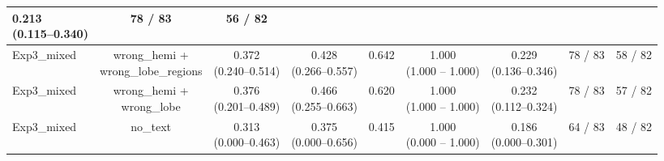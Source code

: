\documentclass[a4paper,12pt]{article}
\begin{document}
\begin{table}[ht]
\begin{tabular}{lcccccccc}
\makecell{0.213 \\ (0.115--0.340)} &
78 / 83 &
\colorbox{orange!20}{56 / 82} \\
\hline
Exp3\_mixed &
\makecell{wrong\_hemi + \\ wrong\_lobe\_regions} &
\makecell{\colorbox{blue!20}{0.372} \\ (0.240--0.514)} &
\makecell{\colorbox{orange!20}{0.428} \\ (0.266--0.557)} &
\colorbox{blue!20}{0.642} &
\makecell{1.000 \\ (1.000 -- 1.000)} &
\makecell{\colorbox{blue!20}{0.229} \\ (0.136--0.346)} &
78 / 83 &
\colorbox{green!20}{58 / 82} \\
\hline
Exp3\_mixed &
\makecell{wrong\_hemi + \\ wrong\_lobe} &
\makecell{\colorbox{green!20}{0.376} \\ (0.201--0.489)} &
\makecell{\colorbox{blue!20}{0.466} \\ (0.255--0.663)} &
0.620 &
\makecell{1.000 \\ (1.000 -- 1.000)} &
\makecell{\colorbox{green!20}{0.232} \\ (0.112--0.324)} &
78 / 83 &
\colorbox{blue!20}{57 / 82} \\
\hline
Exp3\_mixed &
no\_text &
\makecell{0.313 \\ (0.000--0.463)} &
\makecell{0.375 \\ (0.000--0.656)} &
0.415 &
\makecell{1.000 \\ (0.000 -- 1.000)} &
\makecell{0.186 \\ (0.000--0.301)} &
64 / 83 &
48 / 82 \\
\hline
\end{tabular}
\end{table}
\end{document}

